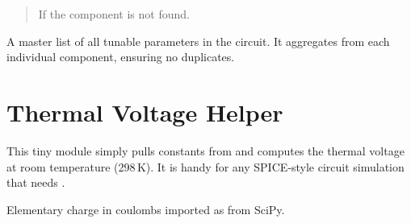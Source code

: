\documentclass[letterpaper,10pt,english]{sphinxmanual}
\begin{document}
\begin{fulllineitems}
\begin{fulllineitems}
\begin{quote}
\begin{description}
\sphinxAtStartPar
{} \textendash{} If the component is not found.

\end{description}\end{quote}

\end{fulllineitems}


\begin{fulllineitems}
\label{\detokenize{circuit:Circuit.differentiable_params}}
\pysigstartsignatures
\pysigline
{}
\pysigstopsignatures
\sphinxAtStartPar
A master list of all tunable parameters in the circuit.  It aggregates
 from each individual
component, ensuring no duplicates.

\end{fulllineitems}


\end{fulllineitems}


\sphinxstepscope


\chapter{Thermal Voltage Helper}
\label{\detokenize{thermal_constants:thermal-voltage-helper}}\label{\detokenize{thermal_constants:thermal-constants}}\label{\detokenize{thermal_constants::doc}}
\sphinxAtStartPar
This tiny module simply pulls constants from  and
computes the thermal voltage at room temperature (298 K).  It is handy for
any SPICE‑style circuit simulation that needs .

\begin{fulllineitems}
\label{\detokenize{thermal_constants:e}}
\pysigstartsignatures
\pysigline
{}
\pysigstopsignatures
\sphinxAtStartPar
Elementary charge in coulombs \textendash{} imported as  from SciPy.

\end{fulllineitems}
\end{document}
